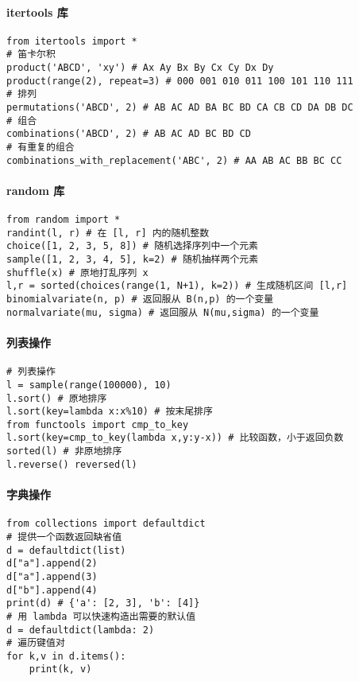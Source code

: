 \paragraph*{itertools 库}

\begin{verbatim}
from itertools import *
# 笛卡尔积
product('ABCD', 'xy') # Ax Ay Bx By Cx Cy Dx Dy
product(range(2), repeat=3) # 000 001 010 011 100 101 110 111
# 排列
permutations('ABCD', 2) # AB AC AD BA BC BD CA CB CD DA DB DC
# 组合
combinations('ABCD', 2) # AB AC AD BC BD CD
# 有重复的组合
combinations_with_replacement('ABC', 2) # AA AB AC BB BC CC
\end{verbatim}

\paragraph*{random 库}
\begin{verbatim}
from random import * 
randint(l, r) # 在 [l, r] 内的随机整数
choice([1, 2, 3, 5, 8]) # 随机选择序列中一个元素
sample([1, 2, 3, 4, 5], k=2) # 随机抽样两个元素
shuffle(x) # 原地打乱序列 x
l,r = sorted(choices(range(1, N+1), k=2)) # 生成随机区间 [l,r]
binomialvariate(n, p) # 返回服从 B(n,p) 的一个变量
normalvariate(mu, sigma) # 返回服从 N(mu,sigma) 的一个变量
\end{verbatim}

\paragraph*{列表操作}
\begin{verbatim}
# 列表操作
l = sample(range(100000), 10)
l.sort() # 原地排序
l.sort(key=lambda x:x%10) # 按末尾排序
from functools import cmp_to_key
l.sort(key=cmp_to_key(lambda x,y:y-x)) # 比较函数，小于返回负数
sorted(l) # 非原地排序
l.reverse() reversed(l)
\end{verbatim}
\paragraph*{字典操作}
\begin{verbatim}
from collections import defaultdict
# 提供一个函数返回缺省值
d = defaultdict(list)
d["a"].append(2)
d["a"].append(3)
d["b"].append(4)
print(d) # {'a': [2, 3], 'b': [4]}
# 用 lambda 可以快速构造出需要的默认值
d = defaultdict(lambda: 2)
# 遍历键值对
for k,v in d.items():
    print(k, v)
\end{verbatim}

